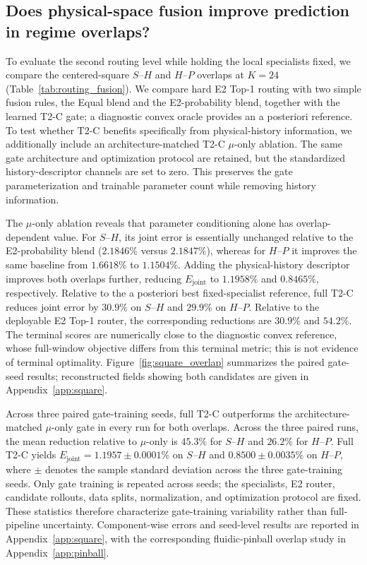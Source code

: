 \subsection{Does physical-space fusion improve prediction in regime overlaps?}
To evaluate the second routing level while holding the local specialists fixed, we compare the centered-square $S$--$H$ and $H$--$P$ overlaps at $K=24$ (Table~\ref{tab:routing_fusion}). We compare hard E2 Top-1 routing with two simple fusion rules, the Equal blend and the E2-probability blend, together with the learned T2-C gate; a diagnostic convex oracle provides an a posteriori reference. To test whether T2-C benefits specifically from physical-history information, we additionally include an architecture-matched T2-C $\mu$-only ablation. The same gate architecture and optimization protocol are retained, but the standardized history-descriptor channels are set to zero. This preserves the gate parameterization and trainable parameter count while removing history information.


The $\mu$-only ablation reveals that parameter conditioning alone has overlap-dependent value. For $S$--$H$, its joint error is essentially unchanged relative to the E2-probability blend ($2.1846\%$ versus $2.1847\%$), whereas for $H$--$P$ it improves the same baseline from $1.6618\%$ to $1.1504\%$. Adding the physical-history descriptor improves both overlaps further, reducing $E_{\mathrm{joint}}$ to $1.1958\%$ and $0.8465\%$, respectively. Relative to the a posteriori best fixed-specialist reference, full T2-C reduces joint error by $30.9\%$ on $S$--$H$ and $29.9\%$ on $H$--$P$. Relative to the deployable E2 Top-1 router, the corresponding reductions are $30.9\%$ and $54.2\%$. The terminal scores are numerically close to the diagnostic convex reference, whose full-window objective differs from this terminal metric; this is not evidence of terminal optimality. Figure~\ref{fig:square_overlap} summarizes the paired gate-seed results; reconstructed fields showing both candidates are given in Appendix~\ref{app:square}.

Across three paired gate-training seeds, full T2-C outperforms the architecture-matched $\mu$-only gate in every run for both overlaps.
Across the three paired runs, the mean reduction relative to $\mu$-only is $45.3\%$ for $S$--$H$ and $26.2\%$ for $H$--$P$. Full T2-C yields
$E_{\mathrm{joint}}=1.1957\pm0.0001\%$ on $S$--$H$ and $0.8500\pm0.0035\%$ on $H$--$P$, where $\pm$ denotes the sample standard
deviation across the three gate-training seeds. Only gate training is repeated across seeds; the specialists, E2 router, candidate rollouts, data splits, normalization, and optimization protocol are fixed. These statistics therefore characterize gate-training variability rather than full-pipeline uncertainty. Component-wise errors and seed-level results are reported in Appendix~\ref{app:square}, with the corresponding fluidic-pinball overlap study in Appendix~\ref{app:pinball}.



